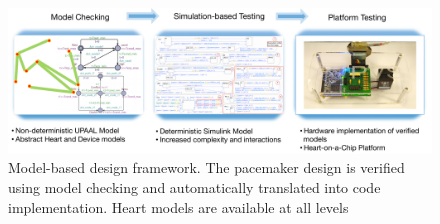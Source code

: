 \begin{figure}[t]
	\centering
	\includegraphics[width=\textwidth]{figs/fig4designtoimplementation.pdf}
	\caption{\small Model-based design framework. The pacemaker design is verified using model checking and automatically translated into code implementation. Heart models are available at all levels}
	\label{fig:modelbaseddesign}
\end{figure}
